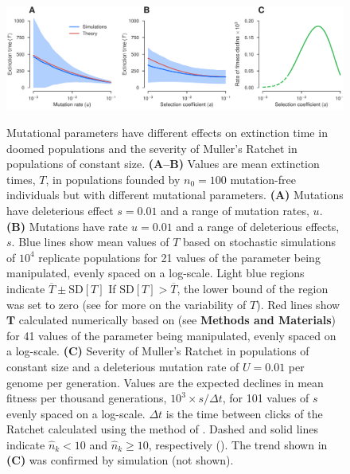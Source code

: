 \documentclass[9pt,lineno]{elife}
\begin{document}
\begin{figure}[ht!]
\includegraphics[width=\linewidth]{valid.pdf}
\caption{
Mutational parameters have different effects on extinction time in doomed populations and the severity of Muller's Ratchet in populations of constant size.
%
\textbf{(A--B)} Values are mean extinction times, $T$, in populations founded by $n_0=100$ mutation-free individuals but with different mutational parameters.
%
\textbf{(A)} Mutations have deleterious effect $s=0.01$ and a range of mutation rates, $u$.
%
\textbf{(B)} Mutations have rate $u=0.01$ and a range of deleterious effects, $s$.
%
Blue lines show mean values of $T$ based on stochastic simulations of $10^4$ replicate populations for 21 values of the parameter being manipulated, evenly spaced on a log-scale.
%
Light blue regions indicate $\overline{T} \pm  \mathrm{SD}[T]$  If $\mathrm{SD}[T] > \overline{T}$, the lower bound of the region was set to zero (see  for more on the variability of $T$).
%
Red lines show $\mathbf{T}$ calculated numerically based on  (see \textbf{Methods and Materials}) for 41 values of the parameter being manipulated, evenly spaced on a log-scale.
%
\textbf{(C)} Severity of Muller's Ratchet in populations of constant size and a deleterious mutation rate of $U = 0.01$ per genome per generation.  Values are the expected declines in mean fitness per thousand generations, $10^3 \times s/\Delta t$, for 101 values of $s$ evenly spaced on a log-scale.  
$\Delta t$ is the time between clicks of the Ratchet calculated using the method of \citet{Gordo_On_2000, gor00b}.
Dashed and solid lines indicate $\hat n_k < 10$ and $\hat n_k \geq 10$, respectively ().  
%
The trend shown in \textbf{(C)} was confirmed by simulation (not shown).
}
\label{fig:valid}
\label{figsupp:sf2}
\end{figure}
\end{document}
